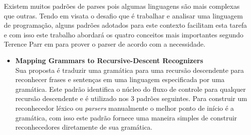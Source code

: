 Existem muitos padr\~{o}es de parses pois algumas linguagens s\~{a}o mais complexas que outras. Tendo em visata o desafio que \'{e} trabalhar e analisar uma linguagem de programa\c{c}\~{a}o, alguns padr\~{o}es adotados para este contexto facilitam esta tarefa e com isso este trabalho abordar\'{a} os quatro conceitos  mais importantes segundo Terence Parr em \cite{Parr:2009:LIP:1823613} para prover o parser de acordo com a necessidade.
\begin{itemize}
	\item \textbf{Mapping Grammars to Recursive-Descent Recognizers}\\
	Sua proposta \'{e} traduzir uma gram\'{a}tica para uma recurs\~{a}o descendente para reconhecer frases e senten\c{c}as em uma linguagem especificada por uma gram\'{a}tica. Este padr\~{a}o identifica o n\'{u}cleo do fluxo de controle para qualquer recurs\~{a}o descendente e \'{e} utilizado nos 3 padr\~{o}es seguintes. 
	Para construir um reconhecedor l\'{e}xico ou \textit{parsers} manualmente o melhor ponto de in\'{i}cio \'{e} a gram\'{a}tica, com isso este padr\~{a}o fornece uma maneira simples de construir reconhecedores diretamente de sua gram\'{a}tica.
	

\end{itemize}
